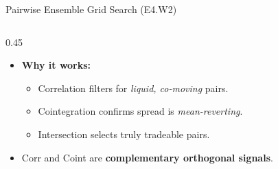 \documentclass[aspectratio=169,10pt]{beamer}
\begin{document}
\begin{frame}{Pairwise Ensemble Grid Search (E4.W2)}
\begin{columns}[T]
\begin{column}{0.45\textwidth}
\begin{itemize}
        \item \textbf{Why it works:}
          \begin{itemize}\itemsep2pt
            \item Correlation filters for \emph{liquid, co-moving} pairs.
            \item Cointegration confirms spread is \emph{mean-reverting}.
            \item Intersection selects truly tradeable pairs.
          \end{itemize}
        \item Corr and Coint are \textbf{complementary orthogonal signals}.
      \end{itemize}
    \end{column}
  \end{columns}
\end{frame}
\end{document}

